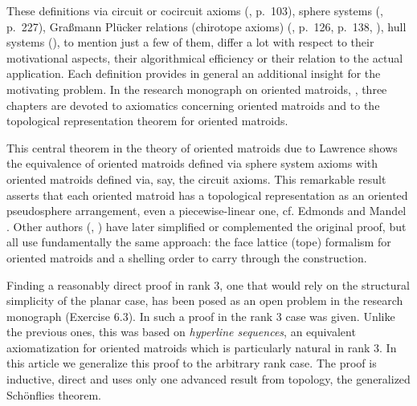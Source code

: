 \documentclass[a4paper]{amsart}
\theoremstyle{definition}
\theoremstyle{remark}
\begin{document}
These definitions via 
%
circuit or cocircuit axioms (\cite{bjorner}, p.~103), sphere systems
(\cite {bjorner}, p.~227), Gra\ss mann Pl\"ucker relations (chirotope
axioms) (\cite {bjorner}, p.~126, p.~138, \cite{GN}), hull systems
(\cite{knuth}), to mention just a few of them, differ a lot with
respect to their motivational aspects, their algorithmical efficiency
or their relation to the actual application.  Each definition provides
in general an additional insight for the motivating problem. In the
research monograph on oriented matroids, \cite{bjorner}, three
chapters are devoted to axiomatics concerning oriented matroids and to
the topological representation theorem for oriented matroids.

This central theorem in the theory of oriented matroids
due to Lawrence shows the equivalence of 
oriented matroids defined via sphere system axioms with
oriented matroids defined via, say, the circuit axioms.
%
This remarkable result asserts that each oriented matroid 
has a topological representation as an oriented pseudosphere arrangement,
even a piecewise-linear one, cf. Edmonds and Mandel \cite{edmonds}.
Other authors 
(\cite{bjorner}, \cite{hochstattler}) have later simplified or complemented 
the original proof, but all use fundamentally the same approach: the
face lattice (tope) formalism for oriented matroids and a shelling order to
carry through the construction.

Finding a reasonably direct proof in rank $3$, 
one that would rely on the structural
simplicity of the planar case,
has been posed as an open problem in the research monograph \cite{bjorner}
(Exercise 6.3). 
In \cite{bokowskimockstreinu} such a proof in the rank 3 case was given.
Unlike the previous ones, this was based on 
\emph{hyperline sequences}, an equivalent axiomatization for oriented 
matroids which is particularly natural in rank $3$. 
%
In this article we generalize this proof to the arbitrary rank case.
%
The proof is inductive, direct and uses only one advanced result from
topology, the generalized Sch\"onflies theorem.
\end{document}
